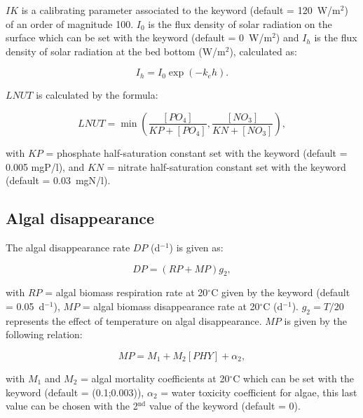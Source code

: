 $IK$ is a calibrating parameter
associated to the keyword 
(default = 120~W/m$^2$) of an order of magnitude 100.
$I_0$ is the flux density of solar radiation on the surface
which can be set with the keyword 
(default = 0~W/m$^2$)
and $I_h$ is the flux density of solar radiation at the bed bottom (W/m$^2$), calculated as:

\begin{equation*}
  I_h = I_0 \exp (-k_e h).
\end{equation*}

$LNUT$ is calculated by the formula:

\begin{equation*}
  LNUT = \min \left( \frac{[PO_4]}{KP+[PO_4]}, \frac{[NO_3]}{KN+[NO_3]} \right),
\end{equation*}

with $KP$ = phosphate half-saturation constant
set with the keyword 
(default = 0.005 mgP/l),
and $KN$ = nitrate half-saturation constant
set with the keyword 
(default = 0.03~mgN/l).\\

\subsection{Algal disappearance}

The algal disappearance rate $DP$ (d$^{-1}$) is given as:

\begin{equation*}
  DP = (RP+MP) g_2,
\end{equation*}

with $RP$ = algal biomass respiration rate at 20$^{\circ}$C
given by the keyword 
(default = 0.05~d$^{-1}$),
$MP$ = algal biomass disappearance rate at 20$^{\circ}$C (d$^{-1}$).
$g_2 = T/20$ represents the effect of temperature on algal disappearance.
$MP$ is given by the following relation:

\begin{equation*}
  MP = M_1 + M_2 [PHY] + \alpha_2,
\end{equation*}

with $M_1$ and $M_2$ = algal mortality coefficients at 20$^{\circ}$C
which can be set with the keyword
 (default = (0.1;0.003)),
$\alpha_2$ = water toxicity coefficient for algae,
this last value can be chosen with the 2$^{\textrm{nd}}$ value of the keyword
 (default = 0).

